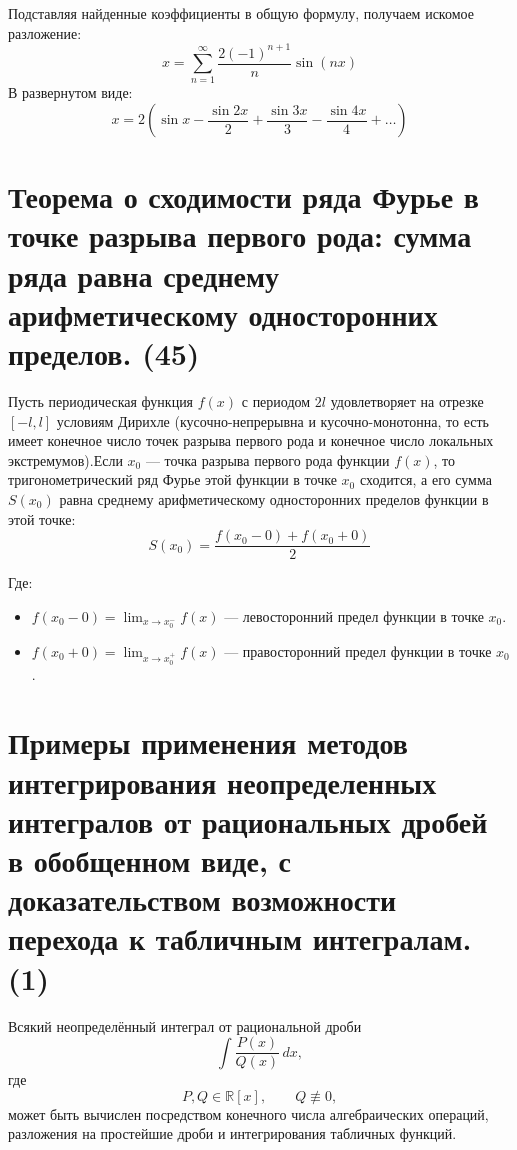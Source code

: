 \documentclass[14pt]{extreport}
\begin{document}
    Подставляя найденные коэффициенты в общую формулу, получаем искомое разложение:$$x = \sum_{n=1}^{\infty} \frac{2(-1)^{n+1}}{n} \sin(nx)$$В развернутом виде:$$x = 2 \left( \sin x - \frac{\sin 2x}{2} + \frac{\sin 3x}{3} - \frac{\sin 4x}{4} + \dots \right)$$

    \chapter{Теорема о сходимости ряда Фурье в точке разрыва первого рода: сумма ряда равна
среднему арифметическому односторонних пределов. (45)}

    \begin{theorem}
        Пусть периодическая функция $f(x)$ с периодом $2l$ удовлетворяет на отрезке $[-l, l]$ условиям Дирихле (кусочно-непрерывна и кусочно-монотонна, то есть имеет конечное число точек разрыва первого рода и конечное число локальных экстремумов).Если $x_0$ — точка разрыва первого рода функции $f(x)$, то тригонометрический ряд Фурье этой функции в точке $x_0$ сходится, а его сумма $S(x_0)$ равна среднему арифметическому односторонних пределов функции в этой точке:$$S(x_0) = \frac{f(x_0 - 0) + f(x_0 + 0)}{2}$$

        Где:
        \begin{itemize}
            \item $f(x_0 - 0) = \lim_{x \to x_0^-} f(x)$ — левосторонний предел функции в точке $x_0$.
            \item $f(x_0 + 0) = \lim_{x \to x_0^+} f(x)$ — правосторонний предел функции в точке $x_0$.
        \end{itemize}
    \end{theorem}







\chapter{Примеры применения методов интегрирования неопределенных интегралов от рациональных дробей в обобщенном виде, с доказательством возможности перехода к табличным интегралам. (1)}
\begin{theorem}
Всякий неопределённый интеграл от рациональной дроби
\[
\int \frac{P(x)}{Q(x)}\,dx,
\]
где
\[
P,Q\in\mathbb R[x],
\qquad
Q\not\equiv0,
\]
может быть вычислен посредством конечного числа алгебраических операций,
разложения на простейшие дроби и интегрирования табличных функций.
\end{theorem}
\end{document}
